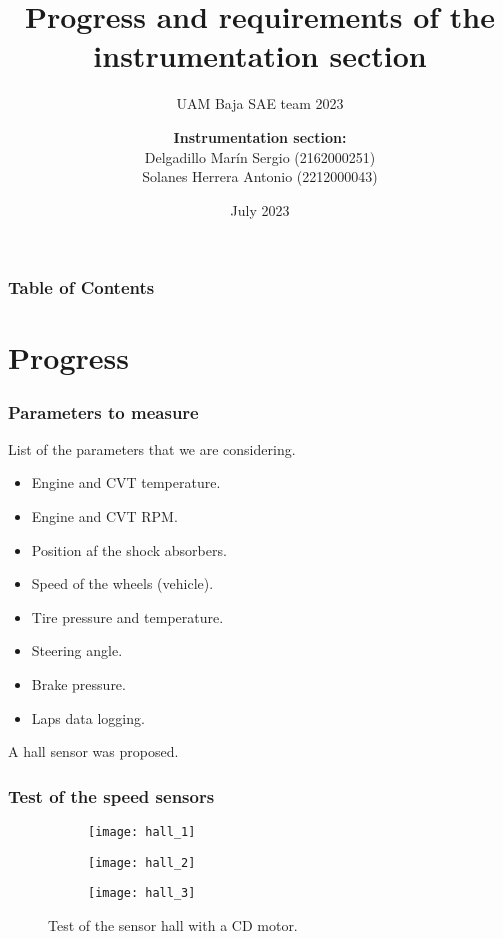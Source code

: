 \documentclass{beamer}
\title[UAM Baja SAE team 2023] %
{Progress and requirements of the instrumentation section}
\subtitle{UAM Baja SAE team 2023}
\author[Instrumentation section] {
	\textbf{Instrumentation section:} \\
	\vspace{0.5cm}
	 Delgadillo Marín Sergio (2162000251)\\
	 Solanes Herrera Antonio (2212000043) 
}
\date[July 2023] %
{July 2023}
\begin{document}
	
	\frame{\titlepage}
	
	\begin{frame}
		\frametitle{Table of Contents}
		\tableofcontents
	\end{frame}
	
	
	\section{Progress}
	
	\begin{frame}
		\frametitle{Parameters to measure}
		List of the parameters that we are considering.
		\begin{itemize}
			\item Engine and CVT temperature.
			\item Engine and CVT RPM.
			\item Position af the shock absorbers.
			\item Speed of the wheels (vehicle).
			\item Tire pressure and temperature.
			\item Steering angle.
			\item Brake pressure.
			\item Laps data logging.
		\end{itemize}
	\end{frame}

	\begin{frame}
		A hall sensor was proposed.
		\frametitle{Test of the speed sensors}
		\begin{figure}
			\centering
			\begin{subfigure}[b]{0.3\textwidth}
				\centering
				\texttt{[image: hall\_1]}
			\end{subfigure}
			\hfill
			\begin{subfigure}[b]{0.3\textwidth}
				\centering
				\texttt{[image: hall\_2]}
			\end{subfigure}
			\hfill
		\begin{subfigure}[b]{0.3\textwidth}
			\centering
			\texttt{[image: hall\_3]}
		\end{subfigure}
			\caption{Test of the sensor hall with a CD motor.}
			\label{fig:hall}
		\end{figure}

	\end{frame}
\end{document}
